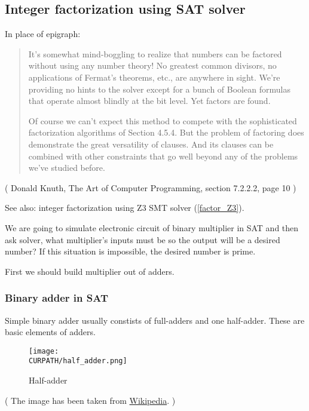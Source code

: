 \subsection{Integer factorization using SAT solver}
\label{factor_SAT}

In place of epigraph:

\begin{framed}
\begin{quotation}
It's somewhat mind-boggling to realize that numbers can be factored without
using any number theory! No greatest common divisors, no applications of
Fermat's theorems, etc., are anywhere in sight. We're providing no hints to
the solver except for a bunch of Boolean formulas that operate almost blindly
at the bit level. Yet factors are found.

Of course we can't expect this method to compete with the sophisticated factorization algorithms
of Section 4.5.4. But the problem of factoring does 
demonstrate the great versatility of clauses. And its clauses can be combined with other
constraints that go well beyond any of the problems we've studied before.
\end{quotation}
\end{framed}
( Donald Knuth, The Art of Computer Programming, section 7.2.2.2, page 10 )

\renewcommand{\CURPATH}{equations/factor_SAT}

See also: integer factorization using Z3 SMT solver (\ref{factor_Z3}).

We are going to simulate electronic circuit of binary multiplier in SAT and then ask solver, what multiplier's inputs must be so the output will be a desired number?
If this situation is impossible, the desired number is prime.

First we should build multiplier out of adders.

\subsubsection{Binary adder in SAT}

Simple binary adder usually constists of full-adders and one half-adder.
These are basic elements of adders.

\begin{figure}[H]
\centering
\texttt{[image: \\CURPATH/half\_adder.png]}
\caption{Half-adder}
\end{figure}

( The image has been taken from \href{https://en.wikipedia.org/wiki/Adder_(electronics)}{Wikipedia}. )

